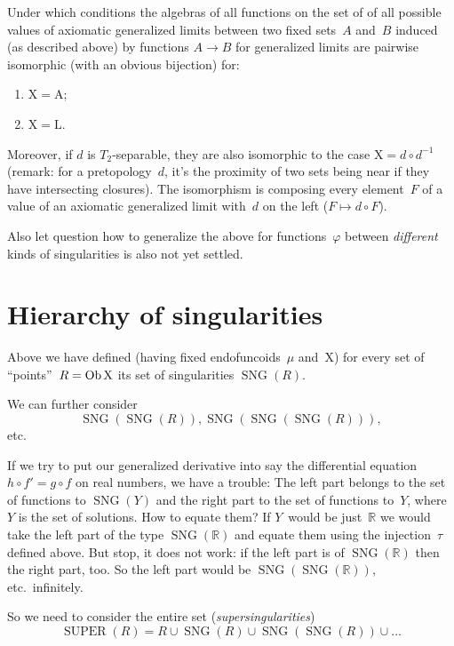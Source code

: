 \begin{question}
Under which conditions the algebras of all functions on the set of of all possible values of axiomatic generalized limits between two fixed sets~$A$ and~$B$ induced (as described above) by functions $A\to B$ for generalized limits are pairwise isomorphic (with an obvious bijection) for:
\begin{enumerate}
\item $\mathrm{X}=\mathrm{A}$;
\item $\mathrm{X}=\mathrm{L}$.
\end{enumerate}
Moreover, if $d$ is $T_2$-separable, they are also isomorphic to the case
$\mathrm{X}=d\circ d^{-1}$ (remark: for a pretopology~$d$, it's the proximity of two sets being near if they have intersecting closures). The isomorphism is composing every element~$F$ of a value of an axiomatic generalized limit with~$d$ on the left ($F\mapsto d\circ F$).
\end{question}

Also let question how to generalize the above for functions~$\varphi$ between \emph{different} kinds of singularities is also not yet settled.

\chapter{Hierarchy of singularities}

Above we have defined (having fixed endofuncoids~$\mu$ and~$\mathrm{X}$) for every set of ``points''~$R=\operatorname{Ob}\mathrm{X}$ its set of singularities $\operatorname{SNG}(R)$.

We can further consider
\[
\operatorname{SNG}(\operatorname{SNG}(R)), \operatorname{SNG}(\operatorname{SNG}(\operatorname{SNG}(R))),
\]
etc.

If we try to put our generalized derivative into say the differential equation $h\circ f'=g\circ f$ on real numbers, we have a trouble: The left part belongs to the set of functions to $\operatorname{SNG}(Y)$ and the right part to the set of functions to~$Y$, where $Y$ is the set of solutions. How to equate them? If $Y$~would be just~$\mathbb{R}$ we would take the left part of the type $\operatorname{SNG}(\mathbb{R})$ and equate them using the injection~$\tau$ defined above. But stop, it does not work: if the left part is of $\operatorname{SNG}(\mathbb{R})$ then the right part, too. So the left part would be $\operatorname{SNG}(\operatorname{SNG}(\mathbb{R}))$, etc.\ infinitely.

So we need to consider the entire set (\emph{supersingularities})
\[
\operatorname{SUPER}(R) =
R\cup\operatorname{SNG}(R)\cup
\operatorname{SNG}(\operatorname{SNG}(R))\cup\dots
\]

